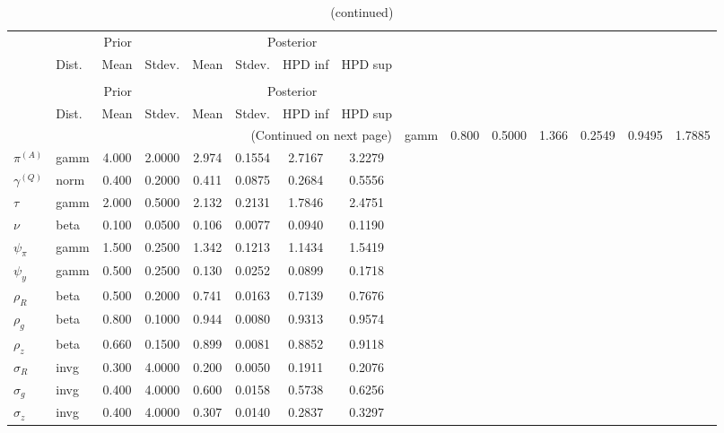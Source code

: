  
\begin{center}
\begin{longtable}{llcccccc} 
\caption{Results from Metropolis-Hastings (parameters)}
 \label{Table:MHPosterior:1}\\
\toprule 
  & \multicolumn{3}{c}{Prior}  &  \multicolumn{4}{c}{Posterior} \\
  \cmidrule(r{.75em}){2-4} \cmidrule(r{.75em}){5-8}
  & Dist. & Mean  & Stdev. & Mean & Stdev. & HPD inf & HPD sup\\
\midrule \endfirsthead 
\caption{(continued)}\\\toprule 
  & \multicolumn{3}{c}{Prior}  &  \multicolumn{4}{c}{Posterior} \\
  \cmidrule(r{.75em}){2-4} \cmidrule(r{.75em}){5-8}
  & Dist. & Mean  & Stdev. & Mean & Stdev. & HPD inf & HPD sup\\
\midrule \endhead 
\bottomrule \multicolumn{8}{r}{(Continued on next page)} \endfoot 
\bottomrule \endlastfoot 
${r_{A}}$ & gamm &   0.800 & 0.5000 &   1.366& 0.2549 &  0.9495 &  1.7885 \\ 
${\pi^{(A)}}$ & gamm &   4.000 & 2.0000 &   2.974& 0.1554 &  2.7167 &  3.2279 \\ 
${\gamma^{(Q)}}$ & norm &   0.400 & 0.2000 &   0.411& 0.0875 &  0.2684 &  0.5556 \\ 
${\tau}$ & gamm &   2.000 & 0.5000 &   2.132& 0.2131 &  1.7846 &  2.4751 \\ 
${\nu}$ & beta &   0.100 & 0.0500 &   0.106& 0.0077 &  0.0940 &  0.1190 \\ 
${\psi_\pi}$ & gamm &   1.500 & 0.2500 &   1.342& 0.1213 &  1.1434 &  1.5419 \\ 
${\psi_y}$ & gamm &   0.500 & 0.2500 &   0.130& 0.0252 &  0.0899 &  0.1718 \\ 
${\rho_R}$ & beta &   0.500 & 0.2000 &   0.741& 0.0163 &  0.7139 &  0.7676 \\ 
${\rho_{g}}$ & beta &   0.800 & 0.1000 &   0.944& 0.0080 &  0.9313 &  0.9574 \\ 
${\rho_z}$ & beta &   0.660 & 0.1500 &   0.899& 0.0081 &  0.8852 &  0.9118 \\ 
${\sigma_R}$ & invg &   0.300 & 4.0000 &   0.200& 0.0050 &  0.1911 &  0.2076 \\ 
${\sigma_{g}}$ & invg &   0.400 & 4.0000 &   0.600& 0.0158 &  0.5738 &  0.6256 \\ 
${\sigma_z}$ & invg &   0.400 & 4.0000 &   0.307& 0.0140 &  0.2837 &  0.3297 \\ 
\end{longtable}
 \end{center}
